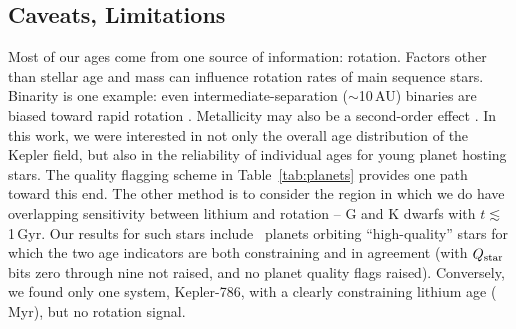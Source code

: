 \documentclass[11pt,twocolumn,tighten]{aastex63}
\begin{document}
%




\subsection{Caveats, Limitations}

Most of our ages come from one source of information: rotation.
Factors other than stellar age and mass can influence rotation rates of main sequence stars.
Binarity is one example: even intermediate-separation ($\sim$10\,AU) binaries are biased
toward rapid rotation
\citep[e.g.][and many studies thereafter]{Meibom_2007}. %
Metallicity may also be a second-order effect
\citep{2020MNRAS.499.3481A,2024arXiv240500779S}.
In this work, we were interested in not only the overall
age distribution of the Kepler field, but also in the reliability of individual ages for
young planet hosting stars.
The quality flagging scheme in Table~\ref{tab:planets} provides one path toward this end.
The other method is to consider the region in which we do have
overlapping sensitivity between lithium and rotation -- 
G and K dwarfs with $t$$\lesssim$1\,Gyr.  
Our results for such stars include
\ltonegyrhighqconfirmedtwosided\ planets orbiting ``high-quality''
stars for which the two age indicators are both constraining and in agreement
(with $Q_{\rm star}$ bits zero through nine not raised, and no planet quality flags raised).
Conversely, we found only one system, Kepler-786, with a clearly
constraining lithium age (\kepseveneightsix\,Myr), but no rotation signal.
\end{document}

